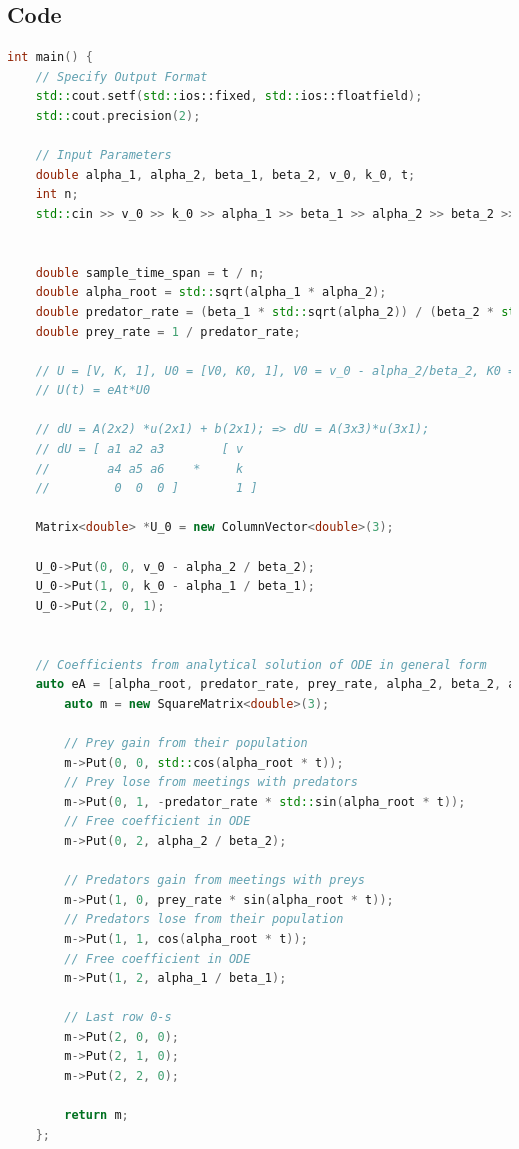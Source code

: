 \documentclass{article}
\begin{document}
\subsection*{Code}
\begin{lstlisting}[language=c++]
int main() {
    // Specify Output Format
    std::cout.setf(std::ios::fixed, std::ios::floatfield);
    std::cout.precision(2);

    // Input Parameters
    double alpha_1, alpha_2, beta_1, beta_2, v_0, k_0, t;
    int n;
    std::cin >> v_0 >> k_0 >> alpha_1 >> beta_1 >> alpha_2 >> beta_2 >> t >> n;


    double sample_time_span = t / n;
    double alpha_root = std::sqrt(alpha_1 * alpha_2);
    double predator_rate = (beta_1 * std::sqrt(alpha_2)) / (beta_2 * std::sqrt(alpha_1));
    double prey_rate = 1 / predator_rate;

    // U = [V, K, 1], U0 = [V0, K0, 1], V0 = v_0 - alpha_2/beta_2, K0 = k_0 - alpha_1/beta_1;
    // U(t) = eAt*U0

    // dU = A(2x2) *u(2x1) + b(2x1); => dU = A(3x3)*u(3x1);
    // dU = [ a1 a2 a3        [ v
    //        a4 a5 a6    *     k
    //         0  0  0 ]        1 ]

    Matrix<double> *U_0 = new ColumnVector<double>(3);

    U_0->Put(0, 0, v_0 - alpha_2 / beta_2);
    U_0->Put(1, 0, k_0 - alpha_1 / beta_1);
    U_0->Put(2, 0, 1);


    // Coefficients from analytical solution of ODE in general form
    auto eA = [alpha_root, predator_rate, prey_rate, alpha_2, beta_2, alpha_1, beta_1](double t) {
        auto m = new SquareMatrix<double>(3);

        // Prey gain from their population
        m->Put(0, 0, std::cos(alpha_root * t));
        // Prey lose from meetings with predators
        m->Put(0, 1, -predator_rate * std::sin(alpha_root * t));
        // Free coefficient in ODE
        m->Put(0, 2, alpha_2 / beta_2);

        // Predators gain from meetings with preys
        m->Put(1, 0, prey_rate * sin(alpha_root * t));
        // Predators lose from their population
        m->Put(1, 1, cos(alpha_root * t));
        // Free coefficient in ODE
        m->Put(1, 2, alpha_1 / beta_1);

        // Last row 0-s
        m->Put(2, 0, 0);
        m->Put(2, 1, 0);
        m->Put(2, 2, 0);

        return m;
    };


\end{lstlisting}
\end{document}
